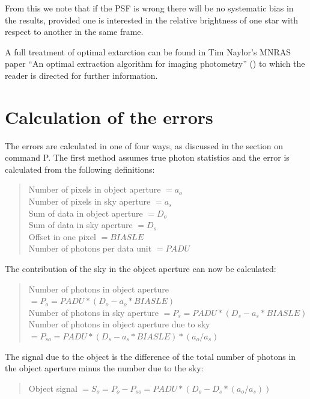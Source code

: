 \documentclass[twoside,11pt,nolof]{starlink}
\begin{document}
From this we note that if the PSF is wrong there will be no systematic bias in the results, provided one is interested in the relative brightness of one star with respect to another in the same frame.

A full treatment of optimal extarction can be found in Tim Naylor's MNRAS paper
``An optimal extraction algorithm for imaging photometry'' () to which the reader is directed for further information.

\section{Calculation of \label{errors}the errors}

The errors are calculated in one of four ways, as discussed in the section
on command P. The first method assumes true photon statistics and the
error is calculated from the following definitions:

\begin{quote}
Number of pixels in object aperture  $= a_o$\\
Number of pixels in sky aperture     $= a_s$\\
Sum of data in object aperture       $= D_o$\\
Sum of data in sky aperture          $= D_s$\\
Offset in one pixel                  $= BIASLE$\\
Number of photons per data unit      $= PADU$
\end{quote}

The contribution of the sky in the object aperture can now be calculated:

\begin{quote}
Number of photons in object aperture $= P_o = PADU * ( D_o - a_o * BIASLE )$\\
Number of photons in sky aperture    $= P_s = PADU * ( D_s - a_s * BIASLE )$\\
Number of photons in object aperture due to sky
$= P_{so} = PADU * ( D_s - a_s * BIASLE ) * ( a_o / a_s )$
\end{quote}

The signal due to the object is the difference of the total number of
photons in the object aperture minus the number due to the sky:

\begin{quote}
Object signal $= S_o = P_o - P_{so} = PADU * ( D_o - D_s * ( a_o / a_s ) )$
\end{quote}
\end{document}
